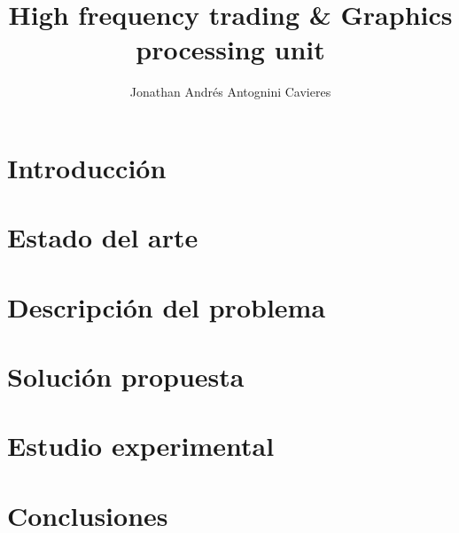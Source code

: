 \documentclass[12pt,letterpaper]{report}
\begin{document}

\title{High frequency trading \& Graphics processing unit}
\author{Jonathan Andrés Antognini Cavieres}
\ingciv



\nolistoffigures
\nolistoftables

\beforepreface



%

%

\afterpreface

\onehalfspacing

%
%
%

\chapter{Introducción}
	

\chapter{Estado del arte}
	

\chapter{Descripción del problema}
	

\chapter{Solución propuesta}
	

\chapter{Estudio experimental}
	

\chapter{Conclusiones}
	

\singlespacing

%
\nocite{*} %

\end{document}
